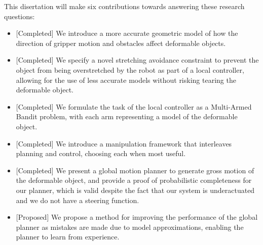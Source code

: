 This disertation will make six contributions towards answering these research questions:
\begin{itemize}
    \item {[Completed]} We introduce a more accurate geometric model of how  the direction of gripper motion and obstacles affect deformable objects.
    \item {[Completed]} We specify a novel stretching avoidance constraint to prevent the object from being overstretched by the robot as part of a local controller, allowing for the use of less accurate models without risking tearing the deformable object.
    \item {[Completed]} We formulate the task of the local controller as a Multi-Armed Bandit problem, with each arm representing a model of the deformable object.
    \item {[Completed]} We introduce a manipulation framework that interleaves planning and control, choosing each when most useful.
    \item {[Completed]} We present a global motion planner to generate gross motion of the deformable object, and provide a proof of probabilistic completeness for our planner, which is valid despite the fact that our system is underactuated and we do not have a steering function.
    \item {[Proposed]} We propose a method for improving the performance of the global planner as mistakes are made due to model approximations, enabling the planner to learn from experience.
\end{itemize}


